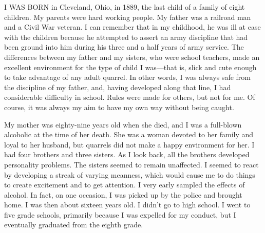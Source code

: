 
\bbChapterPreamble


\begin{biblechapter}
    I WAS BORN in Cleveland, Ohio, in 1889, 
    the last child of a family of eight children.
\verse My parents were hard working people.
\verse My father was a railroad man and a Civil War veteran.
\verse I can remember that in my childhood, 
    he was ill at ease with the children 
    because he attempted to assert an army discipline 
    that had been ground into him 
    during his three and a half years of army service.
\verse The differences between my father and my sisters, 
    who were school teachers, 
    made an excellent environment for the type of child I was—that is, 
    slick and cute enough to take advantage of any adult quarrel.
\verse In other words, 
    I was always safe from the discipline of my father, 
    and, having developed along that line, 
    I had considerable difficulty in school.
\verse Rules were made for others, but not for me.
\verse Of course, 
    it was always my aim to have my own way without being caught.

\verse My mother was eighty-nine years old when she died, and I was a full-blown alcoholic at the time of her death. She was a woman devoted to her family and loyal to her husband, but quarrels did not make a happy environment for her. I had four brothers and three sisters. As I look back, all the brothers developed personality problems. The sisters seemed to remain unaffected. I seemed to react by developing a streak of varying meanness, which would cause me to do things to create excitement and to get attention. I very early sampled the effects of alcohol. In fact, on one occasion, I was picked up by the police and brought home. I was then about sixteen years old. I didn’t go to high school. I went to five grade schools, primarily because I was expelled for my conduct, but I eventually graduated from the eighth grade.


\end{biblechapter}
